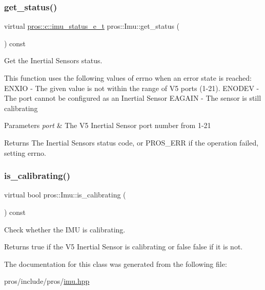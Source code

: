 \subsubsection{\texorpdfstring{get\+\_\+status()}{get\_status()}}
{\footnotesize\ttfamily virtual \hyperlink{imu_8h_a7d3682de24c3a459dddda55d65793309}{pros\+::c\+::imu\+\_\+status\+\_\+e\+\_\+t} pros\+::\+Imu\+::get\+\_\+status (\begin{DoxyParamCaption}{ }\end{DoxyParamCaption}) const\hspace{0.3cm}{\ttfamily [virtual]}}



Get the Inertial Sensor\textquotesingle{}s status. 

This function uses the following values of errno when an error state is reached\+: E\+N\+X\+IO -\/ The given value is not within the range of V5 ports (1-\/21). E\+N\+O\+D\+EV -\/ The port cannot be configured as an Inertial Sensor E\+A\+G\+A\+IN -\/ The sensor is still calibrating


\begin{DoxyParams}{Parameters}
{\em port} & The V5 Inertial Sensor port number from 1-\/21 \\
\hline
\end{DoxyParams}
\begin{DoxyReturn}{Returns}
The Inertial Sensor\textquotesingle{}s status code, or P\+R\+O\+S\+\_\+\+E\+RR if the operation failed, setting errno. 
\end{DoxyReturn}
\mbox{\label{classpros_1_1Imu_af7426c086f6f810cca98f4e77765189c}} 
\subsubsection{\texorpdfstring{is\+\_\+calibrating()}{is\_calibrating()}}
{\footnotesize\ttfamily virtual bool pros\+::\+Imu\+::is\+\_\+calibrating (\begin{DoxyParamCaption}{ }\end{DoxyParamCaption}) const\hspace{0.3cm}{\ttfamily [virtual]}}



Check whether the I\+MU is calibrating. 

\begin{DoxyReturn}{Returns}
true if the V5 Inertial Sensor is calibrating or false false if it is not. 
\end{DoxyReturn}


The documentation for this class was generated from the following file\+:\begin{DoxyCompactItemize}
\item 
pros/include/pros/\hyperlink{imu_8hpp}{imu.\+hpp}\end{DoxyCompactItemize}
